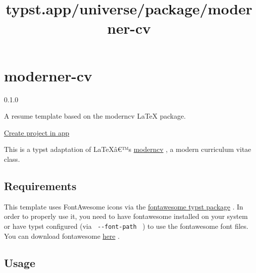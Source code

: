 \title{typst.app/universe/package/moderner-cv}

\label{banner}
\label{template-thumbnail}

\section{moderner-cv}\label{moderner-cv}

{ 0.1.0 }

A resume template based on the moderncv LaTeX package.

\href{/app?template=moderner-cv&version=0.1.0}{Create project in app}

\label{readme}
This is a typst adaptation of LaTeXâ€™s
\href{https://github.com/moderncv/moderncv}{moderncv} , a modern
curriculum vitae class.

\subsection{Requirements}\label{requirements}

This template uses FontAwesome icons via the
\href{https://typst.app/universe/package/fontawesome}{fontawesome typst
package} . In order to properly use it, you need to have fontawesome
installed on your system or have typst configured (via
\texttt{\ -\/-font-path\ } ) to use the fontawesome font files. You can
download fontawesome \href{https://fontawesome.com/download}{here} .

\subsection{Usage}\label{usage}

\begin{Shaded}
\begin{Highlighting}[]

\NormalTok{  ),}
\NormalTok{)}

\end{Highlighting}
\end{Shaded}


